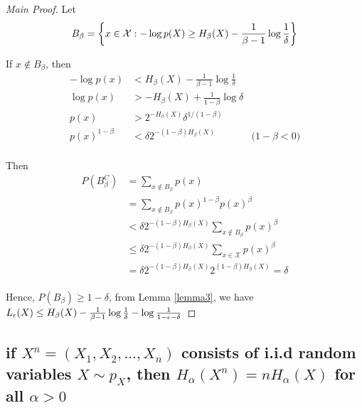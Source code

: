 \documentclass{article}
\begin{document}
\begin{proof}[Main Proof]
Let
$$
    B_\beta = \set*{x \in \mathcal{X}: -\log p(X) \geq H_\beta(X) - \frac{1}{\beta-1} \log \frac{1}{\delta}}
$$

If $x \notin B_\beta$, then
\begin{align*}
    -\log p(x) &< H_\beta(X) - \frac{1}{\beta-1} \log \frac{1}{\delta} \\
    \log p(x) &> - H_\beta(X) + \frac{1}{1-\beta} \log \delta \\
    p(x) &> 2^{- H_\beta(X)} \delta^{1/(1 - \beta)} \\
    p(x)^{1-\beta} &< \delta 2^{- (1-\beta) H_\beta(X)} &\text{($1 - \beta < 0$)}\\
\end{align*}

Then
\begin{align*}
    P(B_\beta^C)
    &= \sum_{x \notin B_\beta} p(x) \\
    &= \sum_{x \notin B_\beta} p(x)^{1-\beta} p(x)^\beta \\
    &< \delta 2^{- (1-\beta) H_\beta(X)} \sum_{x \notin B_\beta} p(x)^\beta \\
    &\leq \delta 2^{- (1-\beta) H_\beta(X)} \sum_{x \in \mathcal{X}} p(x)^\beta \\
    &= \delta 2^{- (1-\beta) H_\beta(X)} 2^{(1-\beta)H_\beta(X)} = \delta \\
\end{align*}

Hence, $P(B_\beta) \geq 1 - \delta$, from Lemma \ref{lemma3}, we have $L_\eps(X) \leq H_\beta(X) - \frac{1}{\beta-1} \log \frac{1}{\delta} - \log \frac{1}{1-\eps-\delta}$
    
\end{proof}



\subsection{if $X^n = (X_1, X_2, ..., X_n)$ consists of i.i.d random variables $X \sim p_X$, then $H_\alpha(X^n) = n H_\alpha(X)$ for all $\alpha > 0$}
\end{document}
